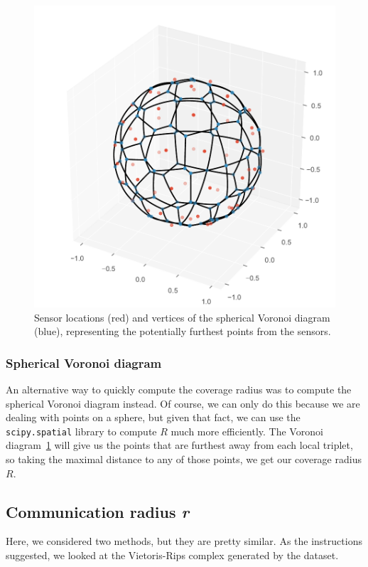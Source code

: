 \documentclass[twocolumn]{article}
\begin{document}
\begin{figure}[H]
    \centering
    \includegraphics[width=\columnwidth]{fig/voronoi}
    \caption{Sensor locations (red) and vertices of the spherical Voronoi diagram (blue), representing the potentially furthest points from the sensors.}
    \label{fig:voronoi}
\end{figure}

\subsubsection{Spherical Voronoi diagram}
An alternative way to quickly compute the coverage radius was to compute the spherical Voronoi diagram instead. Of course, we can only do this because we are dealing with points on a sphere, but given that fact, we can use the \texttt{scipy.spatial} library to compute $R$ much more efficiently. The Voronoi diagram~\ref{fig:voronoi} will give us the points that are furthest away from each local triplet, so taking the maximal distance to any of those points, we get our coverage radius $R$.

\subsection{Communication radius \textit{r}}
Here, we considered two methods, but they are pretty similar. As the instructions suggested, we looked at the Vietoris-Rips complex generated by the dataset.
\end{document}
